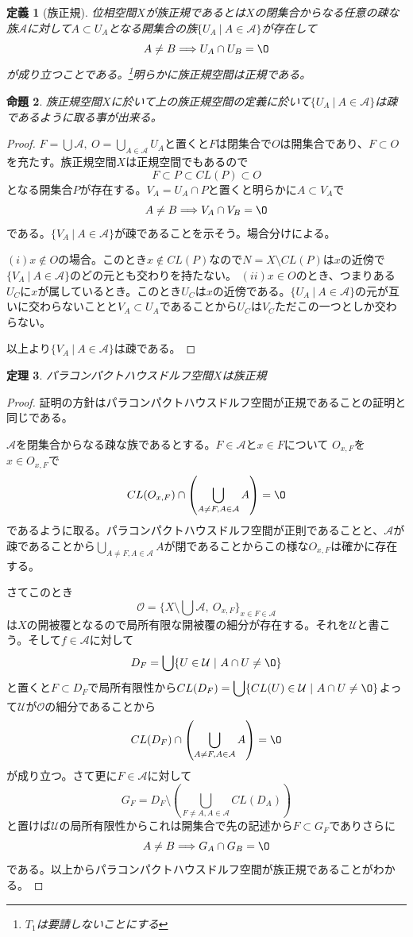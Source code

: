 \documentclass[leqno]{jsarticle}
\newtheorem{thm}{定理}
\newtheorem{prop}[thm]{命題}
\newtheorem{df}[thm]{定義}
\newcommand{\To}{\Longrightarrow}
\newcommand{\dpst}{\displaystyle}
\begin{document}
\begin{df}[族正規]
位相空間$X$が族正規であるとは$X$の閉集合からなる任意の疎な族$\mathcal{A}$に対して$A\subset U_A$となる開集合の族$\{U_{A}\ |\ A\in \mathcal{A}\}$が存在して
\[
A\neq B\To U_A\cap U_B=\O
\]
が成り立つことである。\footnote{$T_1$は要請しないことにする}明らかに族正規空間は正規である。
\end{df}
\begin{prop}\label{benri}
族正規空間$X$に於いて上の族正規空間の定義に於いて$\{U_{A}\ |\ A\in \mathcal{A}\}$は疎であるように取る事が出来る。
\end{prop}
\begin{proof}
$\dpst F=\bigcup\mathcal{A},\ O=\bigcup_{A\in \mathcal{A}}U_A$と置くと$F$は閉集合で$O$は開集合であり、$F\subset O$を充たす。族正規空間$X$は正規空間でもあるので
\[
F\subset P\subset CL(P)\subset O
\]
となる開集合$P$が存在する。$V_A=U_A\cap P$と置くと明らかに$A\subset V_A$で
\[
A\neq B\To V_A\cap V_B=\O
\]
である。$\{V_A\ |\ A\in \mathcal{A}\}$が疎であることを示そう。場合分けによる。\par
$(i)$$x\not\in O$の場合。このとき$x\not\in CL(P)$なので$N=X\setminus CL(P)$は$x$の近傍で$\{V_A\ |\ A\in \mathcal{A}\}$のどの元とも交わりを持たない。
$(ii)$$x\in O$のとき、つまりある$U_C$に$x$が属しているとき。このとき$U_C$は$x$の近傍である。$\{U_{A}\ |\ A\in \mathcal{A}\}$の元が互いに交わらないことと$V_A\subset U_A$であることから$U_C$は$V_C$ただこの一つとしか交わらない。\par 
以上より$\{V_A\ |\ A\in \mathcal{A}\}$は疎である。
\end{proof}

\begin{thm}パラコンパクトハウスドルフ空間$X$は族正規
\end{thm}
\begin{proof}
証明の方針はパラコンパクトハウスドルフ空間が正規であることの証明と同じである。\par
$\mathcal{A}$を閉集合からなる疎な族であるとする。$F\in \mathcal{A}$と$x\in F$について
$O_{x,F}$を$x\in O_{x,F}$で
\[
\dpst CL(O_{x,F})\cap\left(\bigcup_{A\neq F,A\in \mathcal{A}}A\right)=\O
\]
であるように取る。パラコンパクトハウスドルフ空間が正則であることと、$\mathcal{A}$が疎であることから$\bigcup_{A\neq F,A\in \mathcal{A}}A$が閉であることからこの様な$O_{x,F}$は確かに存在する。\par
さてこのとき
\[
\mathcal{O}=\{X\setminus \bigcup\mathcal{A},\ O_{x,F}\}_{x\in F\in \mathcal{A}}
\]
は$X$の開被覆となるので局所有限な開被覆の細分が存在する。それを$\mathcal{U}$と書こう。そして$f\in \mathcal{A}$に対して
\[
D_F=\bigcup\{U\in \mathcal{U}\ |\ A\cap U\neq\O\}
\]と置くと$F\subset D_F$で局所有限性から$\dpst CL(D_F)=\bigcup\{CL(U)\in \mathcal{U}\ |\ A\cap U\neq\O\}$よって$\mathcal{U}$が$\mathcal{O}$の細分であることから
\[
CL(D_F)\cap\left(\bigcup_{A\neq F,A\in \mathcal{A}}A\right)=\O
\]
が成り立つ。さて更に$F\in\mathcal{A}$に対して
\[
G_F=D_F\setminus \left(\bigcup_{F\neq A,A\in \mathcal{A}}CL(D_A)\right)
\]と置けば$\mathcal{U}$の局所有限性からこれは開集合で先の記述から$F\subset G_F$でありさらに
\[
A\neq B\To G_A\cap G_B=\O
\]
である。以上からパラコンパクトハウスドルフ空間が族正規であることがわかる。
\end{proof}
\end{document}
